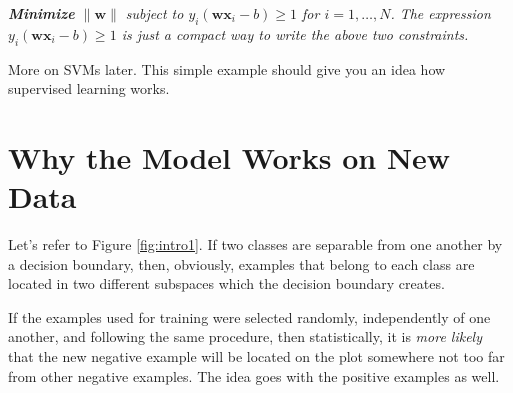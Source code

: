 \textit{\textbf{Minimize} $\|\mathbf{w}\|$ subject to $y_{i}\left(\mathbf{w} \mathbf{x}_{i}-b\right) \geq 1$ for $i=1, \ldots, N$. The expression $y_{i}\left(\mathbf{w} \mathbf{x}_{i}-b\right) \geq 1$ is just a compact way to write the above two constraints.}

More on SVMs later. This simple example should give you an idea how supervised learning works.

\section{Why the Model Works on New Data}

Let's refer to Figure \ref{fig:intro1}. If two classes are separable from one another by a decision boundary, then, obviously, examples that belong to each class are located in two different subspaces which the decision boundary creates.

If the examples used for training were selected randomly, independently of one another, and following the same procedure, then statistically, it is \textit{more likely} that the new negative example will be located on the plot somewhere not too far from other negative examples.  The idea goes with the positive examples as well.

